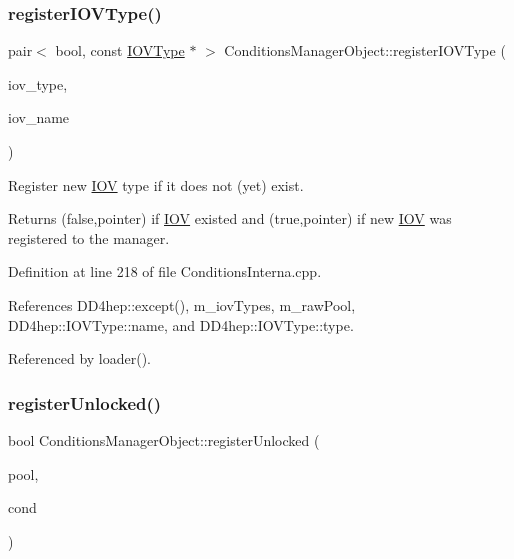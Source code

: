 \subsubsection{\texorpdfstring{register\+I\+O\+V\+Type()}{registerIOVType()}}
{\footnotesize\ttfamily pair$<$ bool, const \hyperlink{class_d_d4hep_1_1_i_o_v_type}{I\+O\+V\+Type} $\ast$ $>$ Conditions\+Manager\+Object\+::register\+I\+O\+V\+Type (\begin{DoxyParamCaption}\item[{size\+\_\+t}]{iov\+\_\+type,  }\item[{const std\+::string \&}]{iov\+\_\+name }\end{DoxyParamCaption})}



Register new \hyperlink{class_d_d4hep_1_1_i_o_v}{I\+OV} type if it does not (yet) exist. 

Returns (false,pointer) if \hyperlink{class_d_d4hep_1_1_i_o_v}{I\+OV} existed and (true,pointer) if new \hyperlink{class_d_d4hep_1_1_i_o_v}{I\+OV} was registered to the manager. 

Definition at line 218 of file Conditions\+Interna.\+cpp.



References D\+D4hep\+::except(), m\+\_\+iov\+Types, m\+\_\+raw\+Pool, D\+D4hep\+::\+I\+O\+V\+Type\+::name, and D\+D4hep\+::\+I\+O\+V\+Type\+::type.



Referenced by loader().

\hypertarget{class_d_d4hep_1_1_conditions_1_1_conditions_manager_object_a745cd16ef676c16294d450c60617fbd1}{}\label{class_d_d4hep_1_1_conditions_1_1_conditions_manager_object_a745cd16ef676c16294d450c60617fbd1} 
\subsubsection{\texorpdfstring{register\+Unlocked()}{registerUnlocked()}}
{\footnotesize\ttfamily bool Conditions\+Manager\+Object\+::register\+Unlocked (\begin{DoxyParamCaption}\item[{\hyperlink{class_d_d4hep_1_1_conditions_1_1_conditions_pool}{Conditions\+Pool} $\ast$}]{pool,  }\item[{\hyperlink{class_d_d4hep_1_1_conditions_1_1_condition}{Condition}}]{cond }\end{DoxyParamCaption})}



